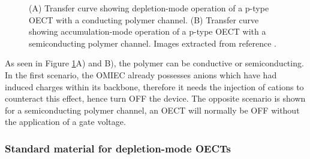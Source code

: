 \begin{figure}[ht]
	\centering
	\caption{(A) Transfer curve showing depletion-mode operation of a p-type OECT with a conducting polymer channel. (B) Transfer curve showing accumulation-mode operation of a p-type OECT with a semiconducting polymer channel. Images extracted from reference \cite{rivnayOrganicElectrochemicalTransistors2018}.}
	\label{fig:modes}
\end{figure}

As seen in Figure \ref{fig:modes}A) and B), the polymer can be conductive or semiconducting. In the first scenario, the OMIEC already possesses anions which have had induced charges within its backbone, therefore it needs the injection of cations to counteract this effect, hence turn OFF the device. The opposite scenario is shown for a semiconducting polymer channel, an OECT will normally be OFF without the application of a gate voltage.

\subsubsection{Standard material for depletion-mode OECTs}

